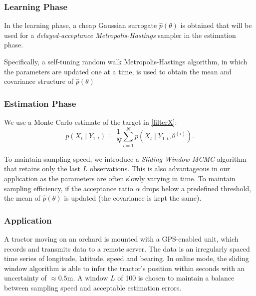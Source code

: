 \documentclass{beamer}
\begin{document}

\begin{frame}
\frametitle{Learning Phase}

In the learning phase, a cheap Gaussian surrogate $\hat{p}(\theta)$ is obtained that will be used for a \textit{delayed-acceptance Metropolis-Hastings} sampler in the estimation phase. 

Specifically, a self-tuning random walk Metropolis-Hastings algorithm, in which the parameters are updated one at a time, is used to obtain the mean and covariance structure of $\hat{p}(\theta)$  

\end{frame}

\begin{frame}
\frametitle{Estimation Phase}

We use a Monte Carlo estimate of the target in \eqref{filterX}:
\begin{equation}
p(X_t\mid Y_{1:t}) \dot{=} \frac{1}{N}\sum_{i=1}^{N}p(X_t\mid Y_{1:t},\theta^{(i)}). 
\end{equation}

To maintain sampling speed, we introduce a \textit{Sliding Window MCMC} algorithm that retains only the last $L$ observations. This is also advantageous in our application as the parameters are often slowly varying in time. To maintain sampling efficiency, if the acceptance ratio $\alpha$ drops below a predefined threshold, the mean of $\hat{p}(\theta)$ is updated (the covariance is kept the same). 

\end{frame}






\begin{frame}
\frametitle{Application}
A tractor moving on an orchard is mounted with a GPS-enabled unit, which records
and transmits data to a remote server. The data is an irregularly spaced time series of longitude, latitude, speed and bearing. In online mode, the sliding window algorithm is able to infer the tractor's position within seconds with an uncertainty of $\approx 0.5\text{m}$. A window $L$ of 100 is chosen to maintain a balance between sampling speed and acceptable estimation errors. 
\end{frame}
\end{document}
